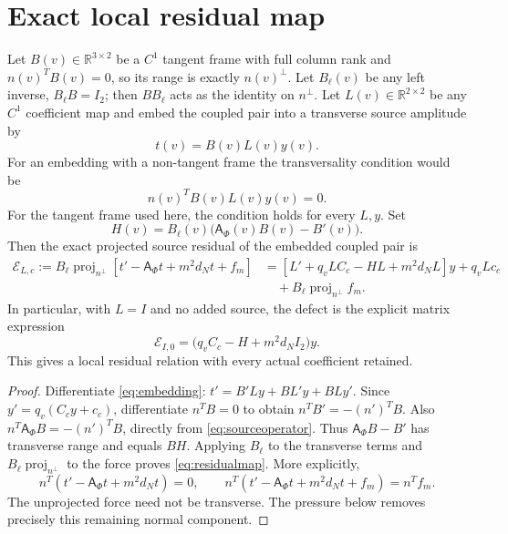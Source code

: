 \documentclass[11pt]{article}
\newcommand{\R}{\mathbb R}
\newcommand{\proj}{\operatorname{proj}}
\begin{document}
\section{Exact local residual map}
Let $B(v)\in\R^{3\times2}$ be a $C^1$ tangent frame with full column rank and
$n(v)^TB(v)=0$, so its range is exactly $n(v)^\perp$.  Let $B_\ell(v)$ be any
left inverse, $B_\ell B=I_2$; then $B B_\ell$ acts as the identity on
$n^\perp$.  Let $L(v)\in\R^{2\times2}$ be any $C^1$ coefficient map and embed
the coupled pair into a transverse source amplitude by
\begin{equation}
 t(v)=B(v)L(v)y(v).
 \label{eq:embedding}
\end{equation}
For an embedding with a non-tangent frame the transversality condition would be
\begin{equation}
 n(v)^TB(v)L(v)y(v)=0.
 \label{eq:transversecondition}
\end{equation}
For the tangent frame used here, the condition holds for every $L,y$.  Set
\begin{equation}
 H(v)=B_\ell(v)\bigl(\mathsf A_\Phi(v)B(v)-B'(v)\bigr).
 \label{eq:Hdef}
\end{equation}
Then the exact projected source residual of the embedded coupled pair is
\begin{align}
 \mathcal E_{L,c}:=B_\ell\proj_{n^\perp}
 \left[t'-\mathsf A_\Phi t+m^2d_Nt+f_m\right]
 &=\left[L'+q_vLC_c-HL+m^2d_NL\right]y+q_vLc_c \\
 &\quad+B_\ell\proj_{n^\perp}f_m.
 \label{eq:residualmap}
\end{align}
In particular, with $L=I$ and no added source, the defect is the explicit
matrix expression
\begin{equation}
 \mathcal E_{I,0}=\bigl(q_vC_c-H+m^2d_NI_2\bigr)y.
 \label{eq:identitydefect}
\end{equation}
This gives a local residual relation with every actual coefficient retained.

\begin{proof}
Differentiate \eqref{eq:embedding}:
$t'=B'L y+B L'y+B L y'$.  Since $y'=q_v(C_cy+c_c)$,
differentiate $n^TB=0$ to obtain $n^TB'=-(n')^TB$. Also
$n^T\mathsf A_\Phi B=-(n')^TB$, directly from
\eqref{eq:sourceoperator}. Thus $\mathsf A_\Phi B-B'$ has transverse
range and equals $BH$. Applying $B_\ell$ to the transverse terms and
$B_\ell\operatorname{proj}_{n^\perp}$ to the force proves
\eqref{eq:residualmap}. More explicitly,
\begin{equation}
 n^T(t'-\mathsf A_\Phi t+m^2d_Nt)=0,\qquad
 n^T(t'-\mathsf A_\Phi t+m^2d_Nt+f_m)=n^Tf_m.
\end{equation}
The unprojected force need not be transverse. The pressure below removes
precisely this remaining normal component.
\end{proof}
\end{document}
